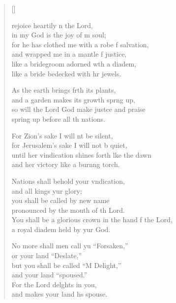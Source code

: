 \settowidth{\versewidth}{You shall be a glorious crown in the hand of the Lord, *}
\begin{verse}[\versewidth]
  \begin{patverse}
 rejoice heartily \pointup{\i}n the Lord,\Med\\
in my God is the joy of m soul;\\
for he has clothed me with a robe f salvation,\Med\\
and wrapped me in a mantle f justice,\\
like a bridegroom adorned w\pointup{\i}th a diadem,\Med\\
like a bride bedecked with hr jewels.

As the earth brings frth its plants,\Med\\
and a garden makes its growth spr\pointup{\i}ng up,\\
so will the Lord God make just\pointup{\i}ce and praise\Med\\
spring up before all th nations.

For Zion’s sake I will nt be silent,\Med\\
for Jerusalem’s sake I will not b quiet,\\
until her vindication shines forth l\pointup{\i}ke the dawn\Med\\
and her victory like a burn\pointup{\i}ng torch.

Nations shall behold your v\pointup{\i}ndication,\Med\\
and all kings yur glory;\\
you shall be called by  new name\Med\\
pronounced by the mouth of th Lord.\\
You shall be a glorious crown in the hand f the Lord,\Med\\
a royal diadem held by yur God.

No more shall men call yu “Forsaken,”\Med\\
or your land “Deslate,”\\
but you shall be called “M Delight,”\Med\\
and your land “spoused.”\\
For the Lord del\pointup{\i}ghts in you,\Med\\
and makes your land h\pointup{\i}s spouse.


\end{patverse}
\end{verse}
